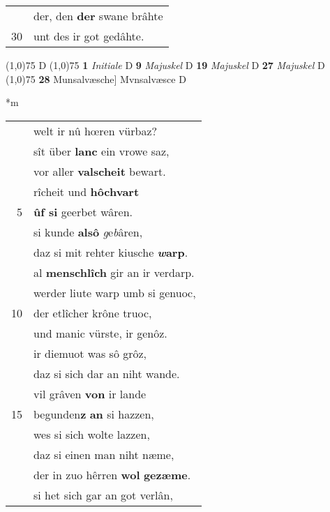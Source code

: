 \documentclass[8pt,a4paper,notitlepage]{article}
\begin{document}
\begin{table}[ht]
\begin{minipage}[t]{0.5\linewidth}
\begin{tabular}{rl}
 & der, den \textbf{der} swane brâhte\\ 
30 & unt des ir got gedâhte.\\ 
\end{tabular}
\scriptsize
\line(1,0){75} \newline
D \newline
\line(1,0){75} \newline
\textbf{1} \textit{Initiale} D  \textbf{9} \textit{Majuskel} D  \textbf{19} \textit{Majuskel} D  \textbf{27} \textit{Majuskel} D  \newline
\line(1,0){75} \newline
\textbf{28} Munsalvæsche] Mvnsalvæsce D \newline
\end{minipage}
\hspace{0.5cm}
\begin{minipage}[t]{0.5\linewidth}
\small
\begin{center}*m
\end{center}
\begin{tabular}{rl}
 & welt ir nû hœren vürbaz?\\ 
 & sît über \textbf{lanc} ein vrowe saz,\\ 
 & vor aller \textbf{valscheit} bewart.\\ 
 & rîcheit und \textbf{hôchvart}\\ 
5 & \textbf{ûf si} geerbet wâren.\\ 
 & si kunde \textbf{alsô} \textit{g}e\textit{b}âren,\\ 
 & daz si mit rehter kiusche \textbf{\textit{w}arp}.\\ 
 & al \textbf{menschlîch} gir an ir verdarp.\\ 
 & werder liute warp umb si genuoc,\\ 
10 & der etlîcher krône truoc,\\ 
 & und manic vürste, ir genôz.\\ 
 & ir diemuot was sô grôz,\\ 
 & daz si sich dar an niht wande.\\ 
 & vil grâven \textbf{von} ir lande\\ 
15 & begunden\textbf{z} \textbf{an} si hazzen,\\ 
 & wes si sich wolte lazzen,\\ 
 & daz si einen man niht næme,\\ 
 & der in zuo hêrren \textbf{wol} \textbf{gezæme}.\\ 
 & si het sich gar an got verlân,\\ 

\end{tabular}
\end{minipage}
\end{table}
\end{document}
